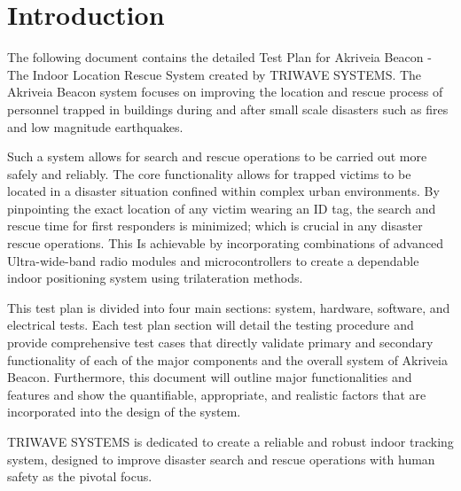 

\setcounter{section}{0}
\section{Introduction}
\bigskip

The following document contains the detailed Test Plan for Akriveia Beacon - The Indoor Location Rescue System created by TRIWAVE SYSTEMS. The Akriveia Beacon system focuses on improving the location and rescue process of personnel trapped in buildings during and after small scale disasters such as fires and low magnitude earthquakes. 

\bigskip
Such a system allows for search and rescue operations to be carried out more safely and reliably. The core functionality allows for trapped victims to be located  in a disaster situation confined within complex urban environments.  By pinpointing the exact location of any victim wearing an ID tag, the search and rescue time for first responders is minimized; which is crucial in any disaster rescue operations. This Is achievable by incorporating combinations of advanced Ultra-wide-band radio modules and microcontrollers to create a dependable indoor positioning system using trilateration methods. 

\bigskip
This test plan is divided into four main sections: system, hardware, software, and electrical tests. Each test plan section will detail the testing procedure and provide comprehensive test cases that directly validate primary and secondary functionality of each of the major components and the overall system of Akriveia Beacon. Furthermore, this document will outline major functionalities and features and show the quantifiable, appropriate, and realistic factors that are incorporated into the design of the system.

\bigskip
TRIWAVE SYSTEMS is dedicated to create a reliable and robust indoor tracking system, designed to improve disaster search and rescue operations with human safety as the pivotal focus.
